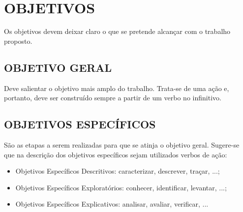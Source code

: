 
\chapter{OBJETIVOS}
\label{chap:objetivos}

Os objetivos devem deixar claro o que se pretende alcançar com o trabalho proposto. 

\section{OBJETIVO GERAL}
\label{sec:obgeral}

Deve salientar o objetivo mais amplo do trabalho. Trata-se de uma ação e, portanto, deve ser construído sempre a partir de um verbo no infinitivo.

\section{OBJETIVOS ESPECÍFICOS}
\label{sec:obesp}

São as etapas a serem realizadas para que se atinja o objetivo geral. Sugere-se que na descrição dos objetivos específicos sejam utilizados verbos de ação:

\begin{itemize}
    \item Objetivos Específicos Descritivos: caracterizar, descrever, traçar, ...;
    \item Objetivos Específicos Exploratórios: conhecer, identificar, levantar, ...;   
    \item Objetivos Específicos Explicativos: analisar, avaliar, verificar, ...
\end{itemize}
